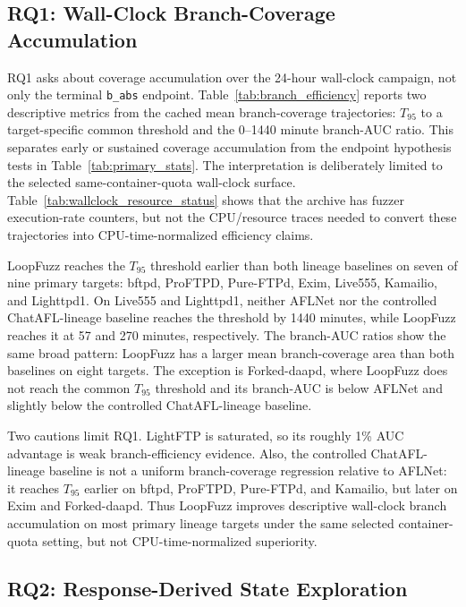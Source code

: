 \documentclass[final,5p,times,number]{elsarticle}
\begin{document}
\subsection{RQ1: Wall-Clock Branch-Coverage Accumulation}
RQ1 asks about coverage accumulation over the 24-hour wall-clock campaign, not only the terminal \texttt{b\_abs} endpoint. Table~\ref{tab:branch_efficiency} reports two descriptive metrics from the cached mean branch-coverage trajectories: $T_{95}$ to a target-specific common threshold and the 0--1440 minute branch-AUC ratio. This separates early or sustained coverage accumulation from the endpoint hypothesis tests in Table~\ref{tab:primary_stats}. The interpretation is deliberately limited to the selected same-container-quota wall-clock surface. Table~\ref{tab:wallclock_resource_status} shows that the archive has fuzzer execution-rate counters, but not the CPU/resource traces needed to convert these trajectories into CPU-time-normalized efficiency claims.

LoopFuzz reaches the $T_{95}$ threshold earlier than both lineage baselines on seven of nine primary targets: bftpd, ProFTPD, Pure-FTPd, Exim, Live555, Kamailio, and Lighttpd1. On Live555 and Lighttpd1, neither AFLNet nor the controlled ChatAFL-lineage baseline reaches the threshold by 1440 minutes, while LoopFuzz reaches it at 57 and 270 minutes, respectively. The branch-AUC ratios show the same broad pattern: LoopFuzz has a larger mean branch-coverage area than both baselines on eight targets. The exception is Forked-daapd, where LoopFuzz does not reach the common $T_{95}$ threshold and its branch-AUC is below AFLNet and slightly below the controlled ChatAFL-lineage baseline.

Two cautions limit RQ1. LightFTP is saturated, so its roughly 1\% AUC advantage is weak branch-efficiency evidence. Also, the controlled ChatAFL-lineage baseline is not a uniform branch-coverage regression relative to AFLNet: it reaches $T_{95}$ earlier on bftpd, ProFTPD, Pure-FTPd, and Kamailio, but later on Exim and Forked-daapd. Thus LoopFuzz improves descriptive wall-clock branch accumulation on most primary lineage targets under the same selected container-quota setting, but not CPU-time-normalized superiority.

\subsection{RQ2: Response-Derived State Exploration}
\end{document}
